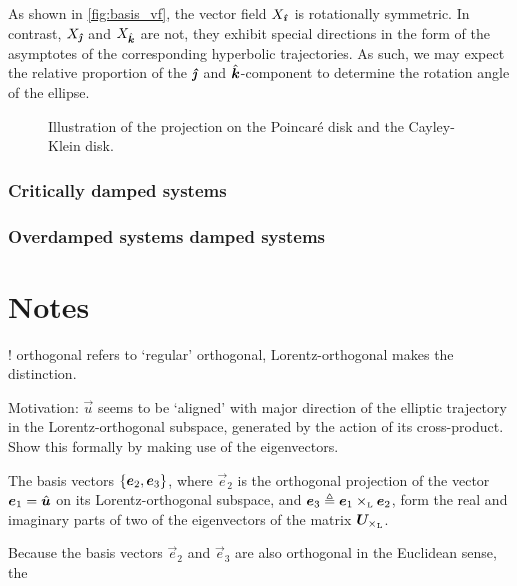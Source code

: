 As shown in \cref{fig:basis_vf}, the vector field $X_\quati$ is rotationally symmetric. In contrast, $X_\quatj$ and $X_\quatk$ are not, they exhibit special directions in the form of the asymptotes of the corresponding hyperbolic trajectories. As such, we may expect the relative proportion of the $\quatj$ and $\quatk$-component to determine the rotation angle of the ellipse.  

\begin{figure}[ht!]
    \centering
    
    \caption{Illustration of the projection on the Poincaré disk and the Cayley-Klein disk.}
    \label{fig:hyperboloid_projection}
\end{figure}

\subsubsection{Critically damped systems}

\subsubsection{Overdamped systems damped systems}

\FloatBarrier
\section{Notes}
! orthogonal refers to `regular' orthogonal, Lorentz-orthogonal makes the distinction.

Motivation: $\vec{u}$ seems to be `aligned' with major direction of the elliptic trajectory in the Lorentz-orthogonal subspace, generated by the action of its cross-product. Show this formally by making use of the eigenvectors.

The basis vectors $ \qty{\vec{e}_2, \vec{e}_3}$, where $\vec{e}_2$ is the orthogonal projection of the vector $\vec{e}_1 = \uvec{u}$ on its Lorentz-orthogonal subspace, and $\vec{e}_3 \triangleq \lorcrossp{\vec{e}_1}{\vec{e}_2}$, form the real and imaginary parts of two of the eigenvectors of the matrix $\mat{U}_{\lorcrossp{}{}}$. 

Because the basis vectors $\vec{e}_2$ and $\vec{e}_3$ are also orthogonal in the Euclidean sense, the 

